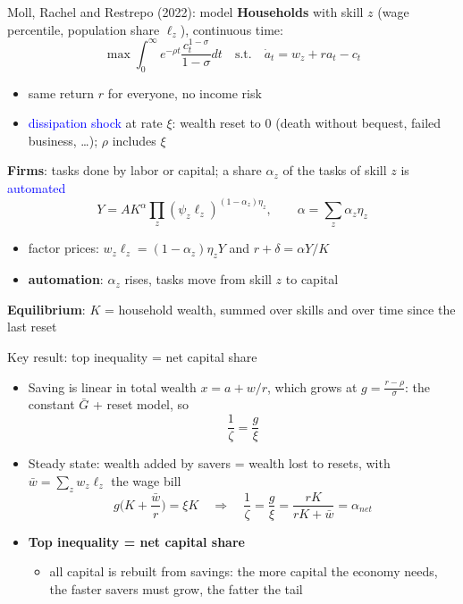 \documentclass[10pt,english,10pt]{beamer}
\begin{document}
\begin{frame}{Moll, Rachel and Restrepo (2022): model}
\textbf{Households} with skill $z$ (wage percentile, population share $\ell_{z}$), continuous time:
\[
\max\int_{0}^{\infty}e^{-\rho t}\frac{c_{t}^{1-\sigma}}{1-\sigma}dt\quad\text{s.t.}\quad\dot{a}_{t}=w_{z}+ra_{t}-c_{t}
\]
\vspace{-4mm}
\begin{itemize}
\item same return $r$ for everyone, no income risk
\item \textcolor{blue}{dissipation shock} at rate $\xi$: wealth reset to 0 (death without bequest, failed business, \ldots); $\rho$ includes $\xi$
\end{itemize}
\textbf{Firms}: tasks done by labor or capital; a share $\alpha_{z}$ of the tasks of skill $z$ is \textcolor{blue}{automated}
\[
Y=AK^{\alpha}\prod_{z}(\psi_{z}\ell_{z})^{(1-\alpha_{z})\eta_{z}},\qquad\alpha=\sum_{z}\alpha_{z}\eta_{z}
\]
\vspace{-4mm}
\begin{itemize}
\item factor prices: $w_{z}\ell_{z}=(1-\alpha_{z})\eta_{z}Y$ and $r+\delta=\alpha Y/K$
\item \textbf{automation}: $\alpha_{z}$ rises, tasks move from skill $z$ to capital
\end{itemize}
\textbf{Equilibrium}: $K$ = household wealth, summed over skills and over time since the last reset
\end{frame}

\begin{frame}{Key result: top inequality = net capital share}
\begin{itemize}
\item Saving is linear in total wealth $x=a+w/r$, which grows at $g=\frac{r-\rho}{\sigma}$: the constant $\bar{G}$ + reset model, so
\[
\frac{1}{\zeta}=\frac{g}{\xi}
\]
\item Steady state: wealth added by savers = wealth lost to resets, with $\bar{w}=\sum_{z}w_{z}\ell_{z}$ the wage bill
\[
g\Big(K+\frac{\bar{w}}{r}\Big)=\xi K\quad\Rightarrow\quad\frac{1}{\zeta}=\frac{g}{\xi}=\frac{rK}{rK+\bar{w}}=\alpha_{net}
\]
\item \textbf{Top inequality = net capital share}
\begin{itemize}
\item all capital is rebuilt from savings: the more capital the economy needs, the faster savers must grow, the fatter the tail
\end{itemize}
\end{itemize}
\end{frame}
\end{document}
